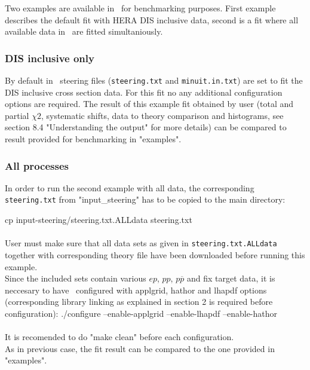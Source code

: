 
\label{section:example}
Two examples are available in \fitter\ for benchmarking purposes.
First example describes the default fit with HERA DIS inclusive data,
second is a fit where all available data in \fitter\ are fitted simultaniously.

\subsubsection{DIS inclusive only}
By default in \fitter\ steering files ({\tt steering.txt} and {\tt minuit.in.txt})
are set to fit the DIS inclusive cross section data. For this fit no any additional
configuration options are required.
The result of this example fit obtained by user (total and partial $\chi2$, systematic shifts, 
data to theory comparison and histograms, see section 8.4 "Understanding the output" for more details) 
can be compared to result provided for benchmarking in "examples".

\subsubsection{All processes}
In order to run the second example with all data, the corresponding
{\tt steering.txt} from "input\_steering" has to be copied to the main directory:

\goodbreak                 
cp input-steering/steering.txt.ALLdata steering.txt
\\ \\
User must make sure that all data sets as given in {\tt steering.txt.ALLdata} together with corresponding theory file have been downloaded  
before running this example. 
\\
Since the included sets contain various $ep$, $pp$, $p \overline p$ and fix target
data, it is neccesary to have \fitter\ configured with applgrid, hathor and 
lhapdf options (corresponding library linking as explained in section 2 is
required before configuration): 
\goodbreak
./configure --enable-applgrid --enable-lhapdf --enable-hathor
\\ \\
It is recomended to do "make clean" before each configuration. \\        
As in previous case, the fit result can be compared to the one provided in "examples".



